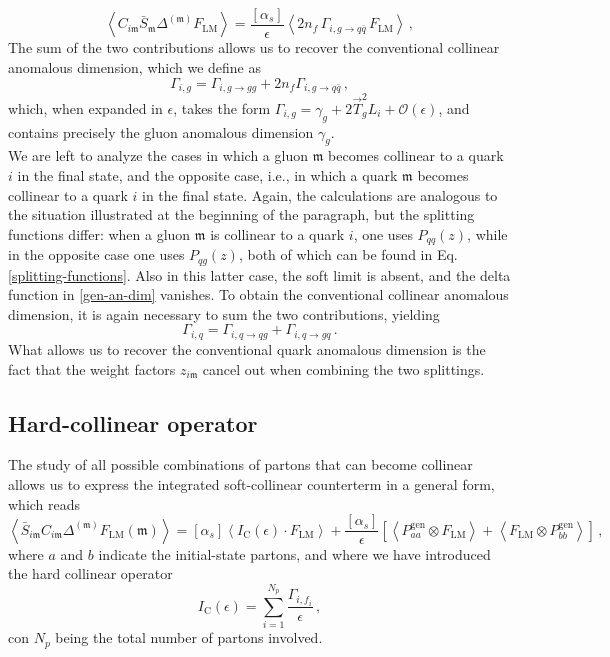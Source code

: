 \documentclass[a4paper, 12pt]{book}
\newcommand{\um}{\mathfrak{m}}
\begin{document}
\begin{equation}
  \left<  C_{i\um} \bar{S}_{\um} \Delta^{(\um)} F_{\mathrm{LM}}\right> = \frac{[\alpha_s]}{\epsilon} \left< 2n_f \, \Gamma_{i,g \to q \bar{q}} \, F_{\mathrm{LM}}\right> \, ,
\end{equation}
The sum of the two contributions allows us to recover the conventional collinear anomalous dimension, which we define as
\begin{equation}
  \Gamma_{i,g} = \Gamma_{i,g \to gg} + 2n_f \Gamma_{i,g \to q \bar{q}} \, ,
\end{equation}
which, when expanded in $\epsilon$, takes the form $\Gamma_{i,g}=\gamma_g + 2 \vec{T}_g^2 L_i + \mathcal{O}(\epsilon)$, and contains precisely the gluon anomalous dimension $\gamma_g$. \\

We are left to analyze the cases in which a gluon $\um$ becomes collinear to a quark $i$ in the final state, and the opposite case, i.e., in which a quark $\um$ becomes collinear to a quark $i$ in the final state. Again, the calculations are analogous to the situation illustrated at the beginning of the paragraph, but the splitting functions differ: when a gluon $\um$ is collinear to a quark $i$, one uses $P_{qq}(z)$, while in the opposite case one uses $P_{qg}(z)$, both of which can be found in Eq. \ref{splitting-functions}. Also in this latter case, the soft limit is absent, and the delta function in \ref{gen-an-dim} vanishes. To obtain the conventional collinear anomalous dimension, it is again necessary to sum the two contributions, yielding
\begin{equation}
  \Gamma_{i,q} = \Gamma_{i,q \to qg} + \Gamma_{i,q \to gq} \,.
\end{equation}
What allows us to recover the conventional quark anomalous dimension is the fact that the weight factors $z_{i\um}$ cancel out when combining the two splittings.


\subsection{Hard-collinear operator}
The study of all possible combinations of partons that can become collinear allows us to express the integrated soft-collinear counterterm in a general form, which reads
\begin{equation}
  \left< \bar{S}_{i\um} C_{i\um} \Delta^{(\um)} F_{\mathrm{LM}}(\um)\right> = [\alpha_s] \left< I_{\mathrm{C}}(\epsilon) \cdot F_{\mathrm{LM}} \right> + \frac{[\alpha_s]}{\epsilon} \left[\left< P_{aa}^{\mathrm{gen}} \otimes F_{\mathrm{LM}} \right> + \left< F_{\mathrm{LM}} \otimes P_{bb}^{\mathrm{gen}}  \right>\right] \, , 
\end{equation}
where $a$ and $b$  indicate the initial-state partons, and where we have introduced the hard collinear operator
\begin{equation}
  I_{\mathrm{C}}(\epsilon) = \sum_{i=1}^{N_p} \frac{\Gamma_{i,f_i}}{\epsilon}  \, ,
\end{equation}
con $N_p$  being the total number of partons involved.
\end{document}
